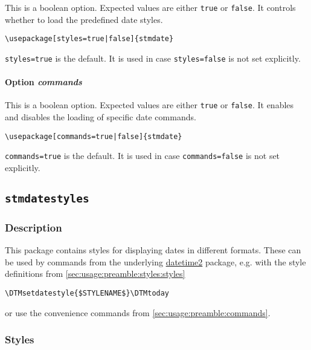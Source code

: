 \documentclass[%
  type=article,%
  layout=koma,%
  date=false,%
  hyperref=true,%
  listings=true%
]{stmtext}
\begin{document}
This is a boolean option. Expected values are either \texttt{true} or \texttt{false}. It controls whether to load the predefined date styles.

\begin{verbatim}
\usepackage[styles=true|false]{stmdate}
\end{verbatim}

\texttt{styles=true} is the default. It is used in case \texttt{styles=false} is not set explicitly.

\paragraph{Option \protect\textit{commands}} 
\label{sec:usage:preamble:wholepackage:options:commands}

This is a boolean option. Expected values are either \texttt{true} or \texttt{false}. It enables and disables the loading of specific date commands.

\begin{verbatim}
\usepackage[commands=true|false]{stmdate}
\end{verbatim}

\texttt{commands=true} is the default. It is used in case \texttt{commands=false} is not set explicitly.

\subsection{\protect\texttt{stmdatestyles}}
\label{sec:usage:preamble:styles}

\subsubsection{Description}
\label{sec:usage:preamble:styles:description}

This package contains styles for displaying dates in different formats. These can be used by commands from the underlying \href{https://ctan.org/pkg/datetime2}{datetime2} package, e.g. with the style definitions from \autoref{sec:usage:preamble:styles:styles}

\begin{verbatim}
\DTMsetdatestyle{$STYLENAME$}\DTMtoday
\end{verbatim}

or use the convenience commands from \autoref{sec:usage:preamble:commands}.

\subsubsection{Styles}
\label{sec:usage:preamble:styles:styles}
\end{document}
